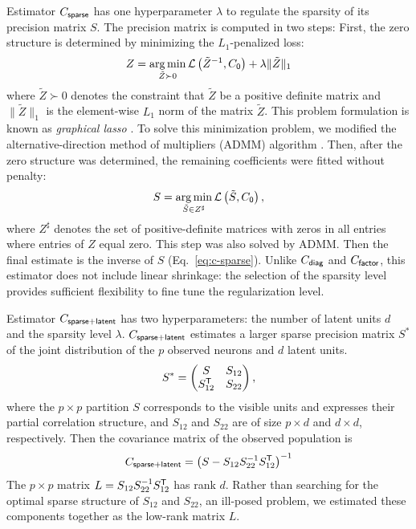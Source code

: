 \documentclass[10pt]{article}
\newcommand{\loss}[1]{\mathcal L\left(#1\right)}
\newcommand{\T}{{\sf T}}
\DeclareMathOperator*{\argmin}{arg\,min}
\begin{document}
Estimator $C_{\sf sparse}$  has one hyperparameter $\lambda$ to regulate the sparsity of its precision matrix $S$. The precision matrix is computed in two steps: First, the zero structure is determined by minimizing the $L_1$-penalized loss:
\begin{equation}
Z = \argmin\limits_{\tilde Z \succ 0} \loss{{\tilde Z}^{-1},C_{\sf 0}} + \lambda \|\tilde Z \|_1
\end{equation}
where $\tilde Z\succ 0$ denotes the constraint that $\tilde Z$ be a positive definite matrix and $\|\tilde Z\|_1$ is the element-wise $L_1$ norm of the matrix $\tilde Z$. This problem formulation is known as \emph{graphical lasso} \cite{Meinshausen:2006, Friedman:2008}. To solve this minimization problem, we modified the alternative-direction method of multipliers (ADMM) algorithm \cite{Ma:2013}. 
Then, after the zero structure was determined, the remaining coefficients were fitted without penalty:
\begin{equation}
S = \argmin\limits_{\tilde S \in Z^\sharp} \loss{\tilde S,C_{\sf 0}},
\end{equation}
where $Z^\sharp$ denotes the set of positive-definite matrices with zeros in all entries where entries of $Z$ equal zero.  This step was also solved by ADMM.  Then the final estimate is the inverse of $S$ (Eq.~\ref{eq:c-sparse}). Unlike $C_{\sf diag}$ and $C_{\sf factor}$, this estimator does not include linear shrinkage: the selection of the sparsity level provides sufficient flexibility to fine tune the regularization level.

Estimator $C_{\sf sparse+latent}$ has two hyperparameters: the number of latent units $d$ and the sparsity level $\lambda$. $C_{\sf sparse+latent}$ estimates a larger sparse precision matrix $S^\ast$ of the joint distribution of the $p$ observed neurons and $d$ latent units.  
\begin{equation}
S^\ast=
\begin{pmatrix}
S & S_{12} \\
S_{12}^\T & S_{22}
\end{pmatrix},
\end{equation}
where the $p\times p$ partition $S$ corresponds to the visible units and expresses their partial correlation structure, and $S_{12}$ and $S_{22}$ are of size $p\times d$ and $d\times d$, respectively. 
Then the covariance matrix of the observed population is 
\begin{equation}
C_{\sf sparse+latent} = \left(S-S_{12}S_{22}^{-1}S_{12}^\T\right)^{-1}
\end{equation}
The $p\times p$  matrix $L=S_{12}S_{22}^{-1}S_{12}^\T$ has rank $d$. Rather than searching for the optimal sparse structure of $S_{12}$ and $S_{22}$, an ill-posed problem, we estimated these components together as the low-rank matrix $L$.
\end{document}

